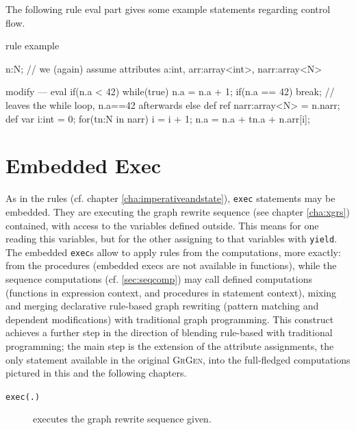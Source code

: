 \begin{example}
The following rule eval part gives some example statements regarding control flow.
  \begin{grgen}
rule example
{
  n:N; // we (again) assume attributes a:int, arr:array<int>, narr:array<N>
	
	modify {
	---
		eval {
			if(n.a < 42) {
				while(true) {
					n.a = n.a + 1;
					if(n.a == 42) {
						break; // leaves the while loop, n.a==42 afterwards
					}
				}
			} else {
				def ref narr:array<N> = n.narr;
				def var i:int = 0;
				for(tn:N in narr) {
					i = i + 1;
					n.a = n.a + tn.a + n.arr[i];
				}
			}
		}
	}
}
  \end{grgen}
\end{example}


\section{Embedded Exec} 

As in the rules (cf. chapter \ref{cha:imperativeandstate}), \texttt{exec} statements may be embedded.
They are executing the graph rewrite sequence (see chapter \ref{cha:xgrs}) contained, with access to the variables defined outside.
This means for one reading this variables, but for the other assigning to that variables with \texttt{yield}.
The embedded \texttt{exec}s allow to apply rules from the computations, more exactly: from the procedures (embedded execs are not available in functions), while the sequence computations (cf. \ref{sec:seqcomp}) may call defined computations (functions in expression context, and procedures in statement context), mixing and merging declarative rule-based graph rewriting (pattern matching and dependent modifications) with traditional graph programming.
This construct achieves a further step in the direction of blending rule-based with traditional programming; the main step is the extension of the attribute assignments, the only statement available in the original {\scshape GrGen}, into the full-fledged computations pictured in this and the following chapters.

\begin{description}
\item[\texttt{exec(.)}] executes the graph rewrite sequence given. 
\end{description}



